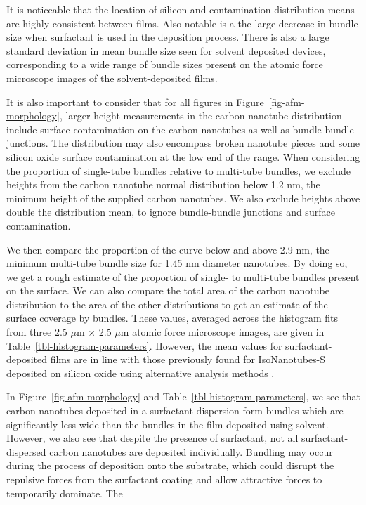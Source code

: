 \documentclass[
  a4paper,
]{scrbook}
\begin{document}
It is noticeable that the location of silicon and contamination
distribution means are highly consistent between films. Also notable is
a the large decrease in bundle size when surfactant is used in the
deposition process. There is also a large standard deviation in mean
bundle size seen for solvent deposited devices, corresponding to a wide
range of bundle sizes present on the atomic force microscope images of
the solvent-deposited films.

It is also important to consider that for all figures in
Figure~\ref{fig-afm-morphology}, larger height measurements in the
carbon nanotube distribution include surface contamination on the carbon
nanotubes as well as bundle-bundle junctions. The distribution may also
encompass broken nanotube pieces and some silicon oxide surface
contamination at the low end of the range. When considering the
proportion of single-tube bundles relative to multi-tube bundles, we
exclude heights from the carbon nanotube normal distribution below 1.2
nm, the minimum height of the supplied carbon nanotubes. We also exclude
heights above double the distribution mean, to ignore bundle-bundle
junctions and surface contamination.

We then compare the proportion of the curve below and above 2.9 nm, the
minimum multi-tube bundle size for 1.45 nm diameter nanotubes. By doing
so, we get a rough estimate of the proportion of single- to multi-tube
bundles present on the surface. We can also compare the total area of
the carbon nanotube distribution to the area of the other distributions
to get an estimate of the surface coverage by bundles. These values,
averaged across the histogram fits from three 2.5 \(\mu\)m \(\times\)
2.5 \(\mu\)m atomic force microscope images, are given in
Table~\ref{tbl-histogram-parameters}. However, the mean values for
surfactant-deposited films are in line with those previously found for
IsoNanotubes-S deposited on silicon oxide using alternative analysis
methods \autocite{Vobornik2023}.

In Figure~\ref{fig-afm-morphology} and
Table~\ref{tbl-histogram-parameters}, we see that carbon nanotubes
deposited in a surfactant dispersion form bundles which are
significantly less wide than the bundles in the film deposited using
solvent. However, we also see that despite the presence of surfactant,
not all surfactant-dispersed carbon nanotubes are deposited
individually. Bundling may occur during the process of deposition onto
the substrate, which could disrupt the repulsive forces from the
surfactant coating and allow attractive forces to temporarily dominate.
The
\end{document}
